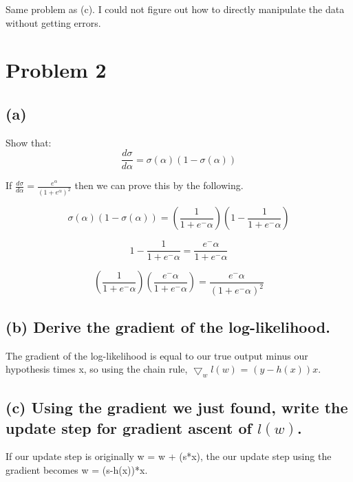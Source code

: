 \documentclass[11pt]{article}
\begin{document}
Same problem as (c). I could not figure out how to directly manipulate the data without getting errors.

\section*{Problem 2}

\subsection*{(a)}

Show that:
\begin{equation*}
\frac{d\sigma}{d\alpha} = \sigma(\alpha)(1 - \sigma(\alpha))
\end{equation*}

If $\frac{d\sigma}{d\alpha} = \frac{e^\alpha}{(1 + e^\alpha)^2}$ then we can prove this by the following.

\begin{equation*}
\sigma(\alpha)(1 - \sigma(\alpha)) = (\frac{1}{1 + e^-\alpha})(1 -\frac{1}{1 + e^-\alpha})
\end{equation*}

\begin{equation*}
1 -\frac{1}{1 + e^-\alpha} = \frac{e^-\alpha}{1 + e^-\alpha}
\end{equation*}

\begin{equation*}
(\frac{1}{1 + e^-\alpha})(\frac{e^-\alpha}{1 + e^-\alpha}) = \frac{e^-\alpha}{(1 + e^-\alpha)^2}
\end{equation*}

\subsection*{(b) Derive the gradient of the log-likelihood.}

The gradient of the log-likelihood is equal to our true output minus our hypothesis times x, so using the chain rule, $\bigtriangledown_wl(w)$ = $(y - h(x))x$.

\subsection*{(c) Using the gradient we just found, write the update step for gradient ascent of $l(w)$.}

If our update step is originally w = w + (s*x), the our update step using the gradient becomes w = (s-h(x))*x.
\end{document}
